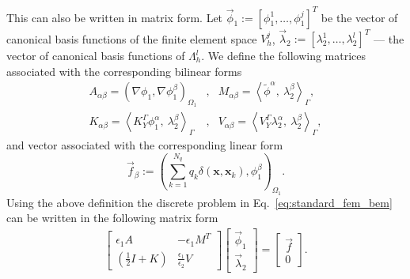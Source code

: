 
This can also be written in matrix form. Let $\vec{\phi}_1 := [\phi_1^1, \dots, \phi_1^j]^T$ be the vector of canonical basis
functions of the finite element space $V_{h}^{j}$, %
$\vec{\lambda}_2 := [\lambda_2^1, \dots, \lambda_2^l]^T$ --- the vector of canonical basis
functions of $\Lambda_{h}^{l}$. %
We define the following matrices associated with the corresponding bilinear forms
\begin{align*}
A_{\alpha \beta} = \left(\nabla \phi_1, \nabla \phi_1^{\beta} \right)_{\Omega_1}  
&,&
M_{\alpha \beta} = \left< \widetilde{\phi}^{\alpha}, \ \lambda^{\beta}_2 \right>_{\Gamma}, \\
K_{\alpha \beta} = \left<K_{Y}^{\Gamma} \phi^{\alpha}_1, \ \lambda^{\beta}_2 \right>_{\Gamma}
 &,&
V_{\alpha \beta} = \left<V_{Y}^{\Gamma} \lambda^{\alpha}_2, \ \lambda^{\beta}_2 \right>_{\Gamma}, 
\end{align*}
and vector associated with the corresponding linear form
\begin{equation*}
\vec{f}_{\beta} := \left(  \sum_{k=1}^{N_q} q_k\delta(\mathbf{x},\mathbf{x}_k),  \phi_1^{\beta} \right)_{\Omega_1}.
\end{equation*}
Using the above definition the discrete problem in Eq.~\eqref{eq:standard_fem_bem} can be written in the following matrix form
\begin{align*}
\begin{bmatrix}
\epsilon_1 A &  - \epsilon_1 M^T \\  
\left(\tfrac12 I + K \right) &  \tfrac{\epsilon_1}{\epsilon_2} V 
\end{bmatrix}
\begin{bmatrix}
\vec{\phi}_1 \\  
\vec{\lambda}_2
\end{bmatrix}
= 
\begin{bmatrix}
\vec{f} \\  
0
\end{bmatrix}.
\end{align*}

